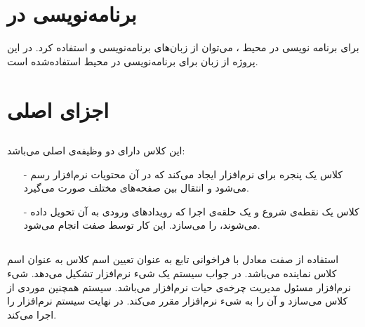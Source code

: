 \documentclass[oneside]{report}
\begin{document}
\section{برنامه‌نویسی در {\normalsize {}}}
	برای برنامه نویسی در محیط 
	{\normalsize {}}
	، می‌توان از زبان‌های برنامه‌نویسی
	{\normalsize {}}
	و 
	{\normalsize {}}
	استفاده کرد. در این پروژه از زبان 
	{\normalsize {}}
	برای برنامه‌نویسی در محیط 
	{\normalsize {}}
	استفاده‌شده است. 
\section{ اجزای اصلی}
	\subsection{{\small {}}}
این کلاس دارای دو وظیفه‌ی اصلی می‌باشد: 
\begin{itemize}
	\item[-]
	کلاس 
	{\normalsize {}}
	یک پنجره برای نرم‌افزار ایجاد می‌کند که در آن محتویات نرم‌افزار رسم می‌شود و انتقال بین صفحه‌های مختلف صورت می‌گیرد.
	\item[-]
	کلاس 
	{\normalsize {}}
	یک نقطه‌ی شروع 
	و یک حلقه‌ی اجرا 
	که رویداد‌های ورودی 
	به ‌آن تحویل داده می‌شوند، را می‌سازد.  این کار توسط صفت 
	{\normalsize {}}	
	انجام می‌شود.
\end{itemize}
	
\subsection{	{\small {}}	}
استفاده از صفت 
	{\normalsize {}}	
	معادل با فراخوانی تابع 
		{\normalsize {}}		
		به عنوان تعیین اسم کلاس
			{\normalsize {}}	
			به عنوان اسم کلاس نماینده 
			می‌باشد.  در جواب سیستم یک شی‌ء نرم‌افزار
			 تشکیل می‌دهد. شیء نرم‌افزار مسئول مدیریت چرخه‌ی حیات 
	نرم‌افزار می‌باشد. سیستم همچنین موردی از کلاس
			{\normalsize {}}	
می‌سازد و آن‌ را به شیء نرم‌افزار مقرر می‌کند. در نهایت سیستم نرم‌افزار را اجرا می‌کند. 
\end{document}
